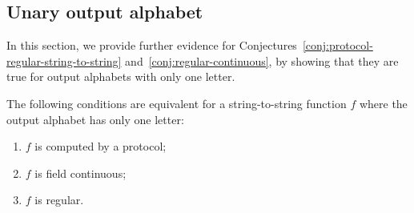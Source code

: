 \subsection{Unary output alphabet}
\label{sec:unary-output-alphabet}
In this section, we provide further evidence for Conjectures~\ref{conj:protocol-regular-string-to-string} and~\ref{conj:regular-continuous}, by showing that they are true for output alphabets with only one letter.
\begin{theorem}\label{thm:unary-string-to-string}
    The following conditions are equivalent for  a string-to-string function $f$ where  the output alphabet  has only one letter:
    \begin{enumerate}
        \item $f$ is computed by a protocol;
        \item \label{it:unary-weighted-continuous} $f$ is field continuous;
        \item \label{it:unary-regular} $f$ is regular.
    \end{enumerate}
\end{theorem}
